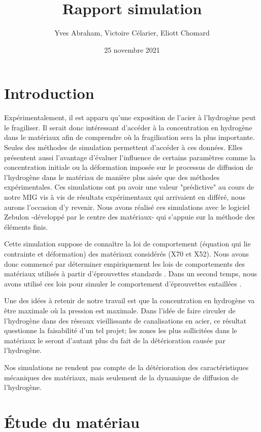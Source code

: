 \documentclass[a4paper, french, 11pt, draft]{article}
\title{Rapport simulation}
\author{Yves Abraham, Victoire Célarier, Eliott Chomard}
\date{25 novembre 2021}
\newcommand{\nuance}[1]{\og #1 \fg}
\begin{document}
    \maketitle
    \section*{Introduction}
    Expérimentalement, il est apparu qu'une exposition de l'acier à l'hydrogène peut le fragiliser. Il serait donc intéressant d'accéder à la concentration en hydrogène dans le matériaux afin de comprendre où la fragilisation sera la plus importante. 
    Seules des méthodes de simulation permettent \og d'accéder \fg à ces données. Elles présentent aussi l'avantage d'évaluer l'influence de certains paramètres comme la concentration initiale ou la déformation imposée sur le processus de diffusion de l'hydrogène dans le matériau de manière plus aisée que des méthodes expérimentales.
    Ces simulations ont pu avoir une valeur "prédictive" au cours de notre MIG vis à vis de résultats expérimentaux qui arrivaient en différé, nous aurons l'occasion d'y revenir.
    Nous avons réalisé ces simulations avec le logiciel Zebulon -développé par le centre des matériaux- qui s'appuie sur la méthode des éléments finis.

    Cette simulation suppose de connaître la loi de comportement (équation qui lie contrainte et déformation) des matériaux considérés (X70 et X52). Nous avons donc commencé par déterminer empiriquement les lois de comportements des matériaux utilisés à partir d'éprouvettes \nuance{standards}. Dans un second temps, nous avons utilisé ces lois pour simuler le comportement d'éprouvettes \nuance{entaillées}.

    Une des idées à retenir de notre travail est que la concentration en hydrogène va être maximale où la pression est maximale. Dans l'idée de faire circuler de l'hydrogène dans des réseaux \nuance{vieillissants} de canalisations en acier, ce résultat questionne la faisabilité d'un tel projet; les zones les plus sollicitées dans le matériaux le seront d'autant plus du fait de la détérioration causée par l'hydrogène.

    Nos simulations ne rendent pas compte de la détérioration des caractéristiques mécaniques des matériaux, mais seulement de la dynamique de diffusion de l'hydrogène.

    \section{Étude du matériau}
\end{document}
